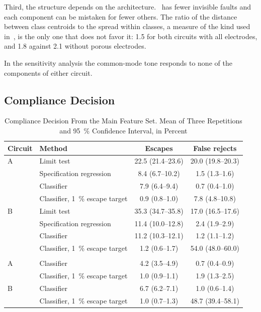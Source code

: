 Third, the structure depends on the architecture. \cA\ has fewer invisible faults and each
component can be mistaken for fewer others. The ratio of the distance between class centroids to
the spread within classes, a measure of the kind used in~\cite{chen2025}, is the only one that does not
favor it: 1.5 for both circuits with all electrodes, and 1.8 against 2.1 without porous
electrodes.

In the sensitivity analysis the common-mode tone responds to none of the components of either
circuit.

\subsection{Compliance Decision}
\label{sec:res-decision}

\begin{table}[!t]
\caption{Compliance Decision From the Main Feature Set. Mean of Three Repetitions and
\SI{95}{\percent} Confidence Interval, in Percent}
\label{tab:decision}
\centering
\setlength{\tabcolsep}{3.5pt}
\begin{tabular}{@{}llcc@{}}
\toprule
Circuit & Method & Escapes & False rejects \\
\midrule
A & Limit test & 22.5 (21.4--23.6) & 20.0 (19.8--20.3) \\
 & Specification regression & 8.4 (6.7--10.2) & 1.5 (1.3--1.6) \\
 & Classifier & 7.9 (6.4--9.4) & 0.7 (0.4--1.0) \\
 & Classifier, \SI{1}{\percent} escape target & 0.9 (0.8--1.0) & 7.8 (4.8--10.8) \\
\addlinespace
B & Limit test & 35.3 (34.7--35.8) & 17.0 (16.5--17.6) \\
 & Specification regression & 11.4 (10.0--12.8) & 2.4 (1.9--2.9) \\
 & Classifier & 11.2 (10.3--12.1) & 1.2 (1.1--1.2) \\
 & Classifier, \SI{1}{\percent} escape target & 1.2 (0.6--1.7) & 54.0 (48.0--60.0) \\
\addlinespace
\multicolumn{4}{@{}l}{\emph{Without porous dry electrodes}} \\
A & Classifier & 4.2 (3.5--4.9) & 0.7 (0.4--0.9) \\
 & Classifier, \SI{1}{\percent} escape target & 1.0 (0.9--1.1) & 1.9 (1.3--2.5) \\
B & Classifier & 6.7 (6.2--7.1) & 1.0 (0.6--1.4) \\
 & Classifier, \SI{1}{\percent} escape target & 1.0 (0.7--1.3) & 48.7 (39.4--58.1) \\
\bottomrule
\end{tabular}
\end{table}

